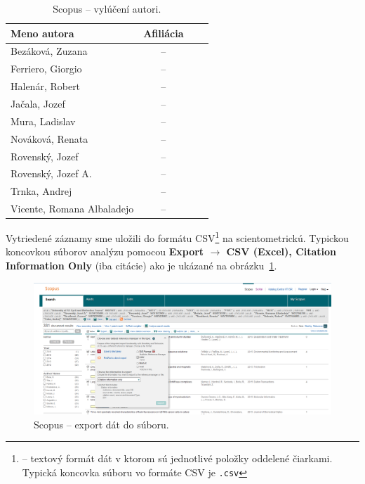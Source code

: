 \begin{table}
\centering\small
\begin{tabular}{lccc}
  \hline\noalign{\vspace{.3ex}}
  Meno autora                & Afiliácia \\[0.3ex]
  \hline\noalign{\vspace{.5ex}}
  Bezáková, Zuzana           & -- \\
  Ferriero, Giorgio          & -- \\
  Halenár, Robert            & -- \\
  Jačala, Jozef              & -- \\
  Mura, Ladislav             & -- \\[1ex]
  Nováková, Renata           & -- \\
  Rovenský, Jozef            & -- \\
  Rovenský, Jozef A.         & -- \\
  Trnka, Andrej              & -- \\
  Vicente, Romana Albaladejo & -- \\[0.5ex]
  \hline
\end{tabular}
\caption{Scopus -- vylúčení autori.}
\label{tab:scopus.exauthors}
\end{table}

Vytriedené záznamy sme uložili do formátu CSV\footnote{ -- textový formát dát v ktorom sú jednotlivé položky oddelené
  čiarkami.  Typická koncovka súboru vo formáte CSV je \texttt{.csv}} na
scientometrickú.  Typickou koncovkou súborov analýzu pomocou \textbf{Export
  $\rightarrow$ CSV (Excel), Citation Information Only} (iba citácie) ako je
ukázané na obrázku~\ref{fig:scopus.export}.

\begin{figure}
  \centering
  \includegraphics[width=\textwidth]{obr/scopus10-cut.jpg}
  \caption{Scopus -- export dát do súboru.}
  \label{fig:scopus.export}
\end{figure}


